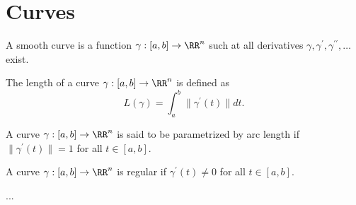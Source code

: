 \section{Curves}
\begin{frame}[allowframebreaks]
  \begin{definition}[Curve]
    A smooth curve is a function $\gamma: [a,b] \to \RR^n$ such at all derivatives $\gamma,\gamma^{\prime},\gamma^{\prime\prime},\ldots$ exist.
  \end{definition}

  \begin{definition}
    The length of a curve $\gamma: [a,b] \to \RR^n$ is defined as
    \[L(\gamma) = \int_a^b \|\gamma^{\prime}(t)\| dt.\]
  \end{definition}

  \begin{definition}
    A curve $\gamma: [a,b] \to \RR^n$ is said to be parametrized by arc length if $\|\gamma^{\prime}(t)\| = 1$ for all $t \in [a,b]$.
  \end{definition}

  \begin{definition}
    A curve $\gamma: [a,b] \to \RR^n$ is regular if $\gamma^{\prime}(t) \neq 0$ for all $t \in [a,b]$.
  \end{definition}

  \begin{theorem}
    ...
  \end{theorem}
\end{frame}